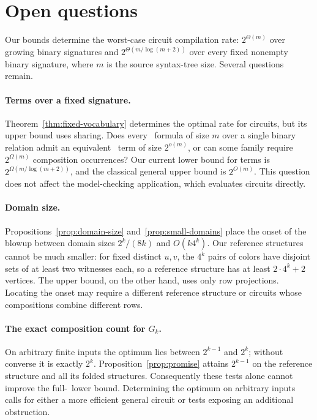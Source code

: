 \section{Open questions}\label{sec:discussion}
Our bounds determine the worst-case circuit compilation rate:
$2^{\Theta(m)}$ over growing binary signatures and
$2^{\Theta(m/\log(m+2))}$ over every fixed nonempty binary signature,
where $m$ is the source syntax-tree size. Several questions remain.

\paragraph{Terms over a fixed signature.}
Theorem~\ref{thm:fixed-vocabulary} determines the optimal rate for
circuits, but its upper bound uses sharing. Does every \FOthree\
formula of size $m$ over a single binary relation admit an equivalent
\CoR\ term of size $2^{o(m)}$, or can some family require
$2^{\Omega(m)}$ composition occurrences?
Our current lower bound for terms is
$2^{\Omega(m/\log(m+2))}$, and the classical general upper bound is
$2^{O(m)}$. This question does not affect the model-checking
application, which evaluates circuits directly.

\paragraph{Domain size.}
Propositions~\ref{prop:domain-size} and~\ref{prop:small-domains}
place the onset of the blowup between
domain sizes $2^k/(8k)$ and $O(k4^k)$. Our reference structures cannot
be much smaller: for fixed distinct $u,v$, the $4^k$ pairs of colors have
disjoint sets of at least two witnesses each, so a reference structure
has at least $2\cdot4^k+2$ vertices. The upper bound, on the other hand,
uses only row projections. Locating the onset may require a different
reference structure or circuits whose compositions combine different
rows.

\paragraph{The exact composition count for $G_k$.}
On arbitrary finite inputs the optimum lies between $2^{k-1}$ and $2^k$;
without converse it is exactly $2^k$. Proposition~\ref{prop:promise}
attains $2^{k-1}$ on the reference structure and all its folded
structures. Consequently these tests alone cannot improve the full-\CoR\
lower bound. Determining the optimum on arbitrary inputs calls for
either a more efficient general circuit or tests exposing an additional
obstruction.
